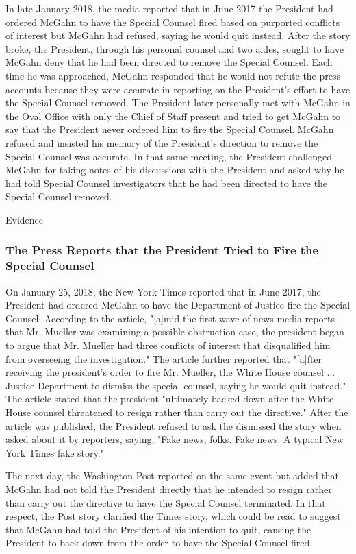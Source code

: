In late January 2018, the media reported that in June 2017 the President had ordered McGahn to have the Special Counsel fired based on purported conflicts of interest but McGahn had refused, saying he would quit instead.
After the story broke, the President, through his personal counsel and two aides, sought to have McGahn deny that he had been directed to remove the Special Counsel.
Each time he was approached, McGahn responded that he would not refute the press accounts because they were accurate in reporting on the President's effort to have the Special Counsel removed.
The President later personally met with McGahn in the Oval Office with only the Chief of Staff present and tried to get McGahn to say that the President never ordered him to fire the Special Counsel.
McGahn refused and insisted his memory of the President's direction to remove the Special Counsel was accurate.
In that same meeting, the President challenged McGahn for taking notes of his discussions with the President and asked why he had told Special Counsel investigators that he had been directed to have the Special Counsel removed.

Evidence

\subsubsection{The Press Reports that the President Tried to Fire the Special Counsel}

On January 25, 2018, the New York Times reported that in June 2017, the President had ordered McGahn to have the Department of Justice fire the Special Counsel.%
According to the article, "[a]mid the first wave of news media reports that Mr. Mueller was examining a possible obstruction case, the president began to argue that Mr. Mueller had three conflicts of interest that disqualified him from overseeing the investigation."%
The article further reported that "[a]fter receiving the president's order to fire Mr. Mueller, the White House counsel ...
Justice Department to dismiss the special counsel, saying he would quit instead."%
The article stated that the president "ultimately backed down after the White House counsel threatened to resign rather than carry out the directive."%
After the article was published, the President
refused to ask the
dismissed the story when asked about it by reporters, saying, "Fake news, folks.
Fake news.
A typical New York Times fake story."%

The next day, the Washington Post reported on the same event but added that McGahn had not told the President directly that he intended to resign rather than carry out the directive to have the Special Counsel terminated.%
In that respect, the Post story clarified the Times story, which could be read to suggest that McGahn had told the President of his intention to quit, causing the President to back down from the order to have the Special Counsel fired.%

